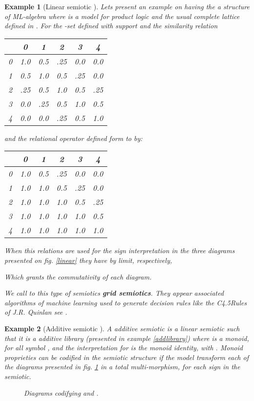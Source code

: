 \documentclass[oribibl]{llncs}
\newtheorem{exam}{Example}
\begin{document}
\begin{exam}[Linear semiotic ]
 Lets present an example on   having  the a structure of ML-algebra where   is a model for product logic and  the usual complete lattice defined in . For the -set defined with support  and the similarity relation
\begin{center}
\small
\begin{tabular}{c|ccccc}
   & 0 & 1 & 2 & 3 & 4 \\
  \hline
  0 & 1.0 & 0.5 & .25 & 0.0 & 0.0 \\
  1 & 0.5 & 1.0 & 0.5 & .25 & 0.0 \\
  2 & .25 & 0.5 & 1.0 & 0.5 & .25 \\
  3 & 0.0 & .25 & 0.5 & 1.0 & 0.5 \\
  4 & 0.0 & 0.0 & .25 & 0.5 & 1.0 \\
\end{tabular}
\end{center}
and the relational operator defined form  to  by:
\begin{center}
\small
\begin{tabular}{c|ccccc}
   & 0 & 1 & 2 & 3 & 4 \\
  \hline
  0 & 1.0 & 0.5 & .25 & 0.0 & 0.0 \\
  1 & 1.0 & 1.0 & 0.5 & .25 & 0.0 \\
  2 & 1.0 & 1.0 & 1.0 & 0.5 & .25 \\
  3 & 1.0 & 1.0 & 1.0 & 1.0 & 0.5 \\
  4 & 1.0 & 1.0 & 1.0 & 1.0 & 1.0 \\
\end{tabular}
\end{center}
When this relations are used for the sign interpretation in the three diagrams presented on fig. \ref{linear} they have by limit, respectively,

Which grants the commutativity of each diagram.

We call to this type of semiotics \textbf{grid semiotics}. They appear associated algorithms of machine learning used to generate decision rules  like the C4.5Rules of J.R. Quinlan see \cite{Michell86}.
\end{exam}

\begin{exam}[Additive semiotic ]
A \emph{additive semiotic}  is a linear semiotic
 such that it is a additive library  (presented in example \ref{addlibrary}) where
 is a monoid, for all symbol , and the interpretation for  is the monoid identity, with . Monoid proprieties can be codified in the semiotic structure if the model
transform each of the diagrams presented in fig. \ref{additive} in a total multi-morphism, for each sign  in the semiotic.
\begin{figure}[h]

\caption{Diagrams codifying  and .}\label{additive}
\end{figure}
\end{exam}
\end{document}
